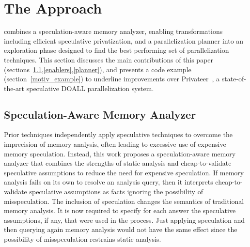 \section{The \name Approach}

\name combines a speculation-aware memory analyzer, enabling
transformations including efficient speculative privatization, and a
parallelization planner into an exploration phase designed to find the
best performing set of parallelization techniques.  This section
discusses the main contributions of this paper
(sections~\ref{analyzer},\ref{enablers},\ref{planner}), and
presents a code example (section~\ref{motiv_example}) to underline
improvements over Privateer~\cite{johnson:12:pldi}, a state-of-the-art
speculative DOALL parallelization system.

\subsection{Speculation-Aware Memory Analyzer}
\label{analyzer}

%
Prior techniques independently apply speculative techniques to
overcome the imprecision of memory analysis, often leading to
excessive use of expensive memory speculation.
%
%
%
%
Instead, this work proposes a speculation-aware memory analyzer that
combines the strengths of static analysis and cheap-to-validate
speculative assumptions to reduce the need for expensive speculation.
If memory analysis fails on its own to resolve an analysis query, then
it interprets cheap-to-validate speculative assumptions as facts
ignoring the possibility of misspeculation.
%
The inclusion of speculation changes the semantics of traditional
memory analysis. It is now required to specify for each answer the
speculative assumptions, if any, that were used in the process.
%
Just applying speculation and then querying again memory analysis
would not have the same effect since the possibility of misspeculation
restrains static analysis.

%
%

